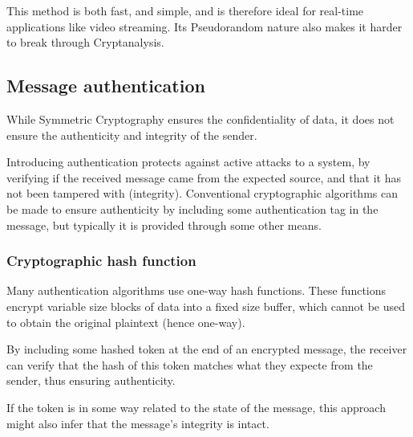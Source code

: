This method is both fast, and simple, and is therefore ideal for real-time applications like video streaming. Its
Pseudorandom nature also makes it harder to break through Cryptanalysis.

\subsection{Message authentication}
While Symmetric Cryptography ensures the confidentiality of data, it does not ensure the authenticity and integrity of the
sender.

Introducing authentication protects against active attacks to a system, by verifying if the received message came from
the expected source, and that it has not been tampered with (integrity). Conventional cryptographic algorithms can be
made to ensure authenticity by including some authentication tag in the message, but typically it is provided through
some other means.

\subsubsection{Cryptographic hash function}
Many authentication algorithms use one-way hash functions. These functions encrypt variable size blocks of data
into a fixed size buffer, which cannot be used to obtain the original plaintext (hence one-way).

By including some hashed token at the end of an encrypted message, the receiver can verify that the hash of this
token matches what they expecte from the sender, thus ensuring authenticity.

If the token is in some way related to the state of the message, this approach might also infer that the message's
integrity is intact.